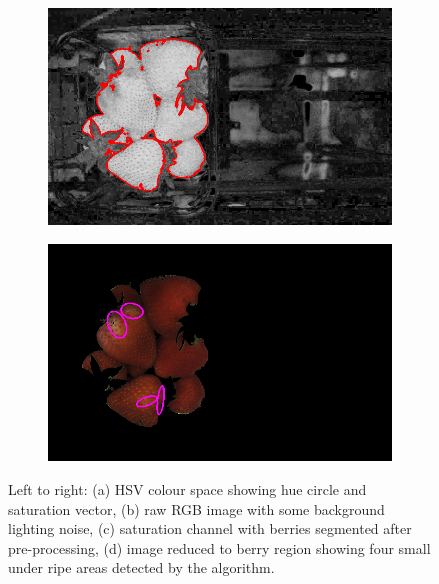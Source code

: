 \documentclass[fleqn,twoside,12pt]{report}
\begin{document}
\begin{figure}[ht]
	\begin{subfigure}{.4\textwidth}
		\centering
		\includegraphics[width=.9\linewidth]{sat_thresh.png}
		\caption{}
		\label{fig:sat_thresh}
	\end{subfigure}%
	\begin{subfigure}{.4\textwidth}
		\centering
		\includegraphics[width=.9\linewidth]{hue_processed.png}
		\caption{}
		\label{fig:hue_processed}
	\end{subfigure}%
	
	\caption{Left to right: (a) HSV colour space showing hue circle and saturation vector, (b) raw RGB image with some background lighting noise, (c) saturation channel with berries segmented after pre-processing, (d) image reduced to berry region showing four small under ripe areas detected by the algorithm.}
	\label{}
\end{figure}
\end{document}
